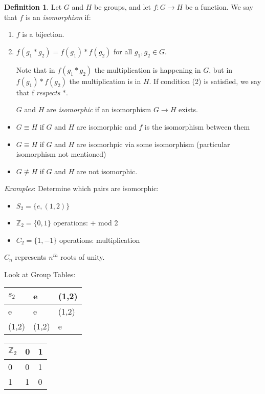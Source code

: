 \documentclass{article}
\theoremstyle{definition}
\newtheorem{definition}{Definition}[section]
\begin{document}
\begin{definition}
Let $G$ and $H$ be groups, and let $f : G \rightarrow H$ be a function. We say that $f$ is an \emph{isomorphism} if:
\begin{enumerate}
\item $f$ is a bijection.
\item $f(g_1 * g_2)=f(g_1) * f(g_2) $ for all $g_1, g_2 \in G$.

Note that in $f(g_1 * g_2)$ the multiplication is happening in $G$, but in $f(g_1) * f(g_2)$ the multiplication is in $H$. If condition (2) is satisfied, we say that f \emph{respects} $*$.

$G$ and $H$ are \emph{isomorphic} if an isomorphism $G \rightarrow H$ exists.
\end{enumerate}
\end{definition}

\begin{itemize}
  \item 
$G \equiv H$ if $G$ and $H$ are isomorphic and $f$ is the isomorphism between them
  \item
$G \equiv H$ if $G$ and $H$ are isomorhpic via some isomorphism (particular isomorphism not mentioned)
  \item 
$G \not\equiv H$ if $G$ and $H$ are not isomorphic.
\end{itemize}

\emph{Examples}: Determine which pairs are isomorphic:

\begin{itemize}
  \item $S_2=\{e, (1, 2)\}$
  \item $\mathbb{Z}_2=\{0,1\}$ operations: + mod 2
  \item $C_2=\{1,-1\}$ operations: multiplication
\end{itemize}
$C_n$ represents $n^{th}$ roots of unity.

Look at Group Tables:

\begin{table}[h]
  \centering
\label{my-label}
\begin{tabular}{l|ll}
$s_2$  & e     & (1,2) \\
\hline
e     & e     & (1,2) \\
(1,2) & (1,2) & e    
\end{tabular}
\end{table}

\begin{table}[h]
  \centering
\label{my-label}
\begin{tabular}{l|ll}
  $\mathbb{Z}_2$  & 0  & 1\\
\hline
0     & 0     & 1 \\
1 & 1 & 0    
\end{tabular}
\end{table}
\end{document}
